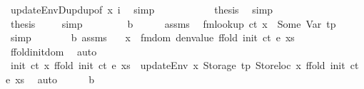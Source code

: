 \begin{isabellebody}
\ updateEnvDup{\isacharunderscore}{\kern0pt}dup{\isacharbrackleft}{\kern0pt}of\ x\ i{\isacharbrackright}{\kern0pt}\ \isamarkupfalse%
\ simp\isanewline
\ \ \ \ \ \ \ \ \isamarkupfalse%
\ \isamarkupfalse%
\ {\isacharquery}{\kern0pt}thesis\ \isamarkupfalse%
\ simp\isanewline
\ \ \ \ \ \ \isamarkupfalse%
\isanewline
\ \ \ \ \isamarkupfalse%
\isanewline
\ \ \ \ \isamarkupfalse%
\ \isamarkupfalse%
\ {\isacharquery}{\kern0pt}thesis\ \isamarkupfalse%
\ {\isacharasterisk}{\kern0pt}\ \isamarkupfalse%
\ simp\isanewline
\ \ \isamarkupfalse%
\isanewline
\ \ \ \ \isamarkupfalse%
\ b\isanewline
\ \ \ \ \isamarkupfalse%
\ assms{\isacharparenleft}{\kern0pt}{}{\isacharparenright}{\kern0pt}\ \isamarkupfalse%
\ {\isachardoublequoteopen}fmlookup\ ct\ x\ {\isacharequal}{\kern0pt}\ Some\ {\isacharparenleft}{\kern0pt}Var\ tp{\isacharparenright}{\kern0pt}{\isachardoublequoteclose}\ \isamarkupfalse%
\ simp\isanewline
\ \ \ \ \isamarkupfalse%
\ \isamarkupfalse%
\ b\ assms{\isacharparenleft}{\kern0pt}{}{\isacharparenright}{\kern0pt}\ \isamarkupfalse%
\ {\isachardoublequoteopen}{\isasymnot}\ x\ {\isacharbar}{\kern0pt}{\isasymin}{\isacharbar}{\kern0pt}\ fmdom\ {\isacharparenleft}{\kern0pt}denvalue\ {\isacharparenleft}{\kern0pt}ffold\ {\isacharparenleft}{\kern0pt}init\ ct{\isacharparenright}{\kern0pt}\ e\ xs{\isacharparenright}{\kern0pt}{\isacharparenright}{\kern0pt}{\isachardoublequoteclose}\ \isamarkupfalse%
\ ffold{\isacharunderscore}{\kern0pt}init{\isacharunderscore}{\kern0pt}dom\ \isamarkupfalse%
\ auto\isanewline
\ \ \ \ \isamarkupfalse%
\ \isamarkupfalse%
\ {\isachardoublequoteopen}init\ ct\ x\ {\isacharparenleft}{\kern0pt}ffold\ {\isacharparenleft}{\kern0pt}init\ ct{\isacharparenright}{\kern0pt}\ e\ xs{\isacharparenright}{\kern0pt}\ {\isacharequal}{\kern0pt}\ updateEnv\ x\ {\isacharparenleft}{\kern0pt}Storage\ tp{\isacharparenright}{\kern0pt}\ {\isacharparenleft}{\kern0pt}Storeloc\ x{\isacharparenright}{\kern0pt}\ {\isacharparenleft}{\kern0pt}ffold\ {\isacharparenleft}{\kern0pt}init\ ct{\isacharparenright}{\kern0pt}\ e\ xs{\isacharparenright}{\kern0pt}{\isachardoublequoteclose}\ \isamarkupfalse%
\ auto\isanewline
\ \ \ \ \isamarkupfalse%
\ b\ {\isacharasterisk}{\kern0pt}\ \isamarkupfalse%

\end{isabellebody}
